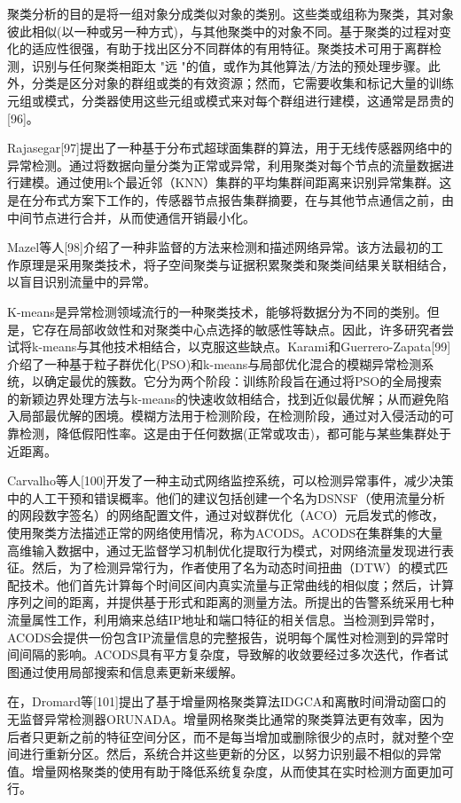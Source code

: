 聚类分析的目的是将一组对象分成类似对象的类别。这些类或组称为聚类，其对象彼此相似(以一种或另一种方式)，与其他聚类中的对象不同。基于聚类的过程对变化的适应性很强，有助于找出区分不同群体的有用特征。聚类技术可用于离群检测，识别与任何聚类相距太 "远 "的值，或作为其他算法/方法的预处理步骤。此外，分类是区分对象的群组或类的有效资源；然而，它需要收集和标记大量的训练元组或模式，分类器使用这些元组或模式来对每个群组进行建模，这通常是昂贵的[96]。

Rajasegar[97]提出了一种基于分布式超球面集群的算法，用于无线传感器网络中的异常检测。通过将数据向量分类为正常或异常，利用聚类对每个节点的流量数据进行建模。通过使用k个最近邻（KNN）集群的平均集群间距离来识别异常集群。这是在分布式方案下工作的，传感器节点报告集群摘要，在与其他节点通信之前，由中间节点进行合并，从而使通信开销最小化。

Mazel等人[98]介绍了一种非监督的方法来检测和描述网络异常。该方法最初的工作原理是采用聚类技术，将子空间聚类与证据积累聚类和聚类间结果关联相结合，以盲目识别流量中的异常。

K-means是异常检测领域流行的一种聚类技术，能够将数据分为不同的类别。但是，它存在局部收敛性和对聚类中心点选择的敏感性等缺点。因此，许多研究者尝试将k-means与其他技术相结合，以克服这些缺点。Karami和Guerrero-Zapata[99]介绍了一种基于粒子群优化(PSO)和k-means与局部优化混合的模糊异常检测系统，以确定最优的簇数。它分为两个阶段：训练阶段旨在通过将PSO的全局搜索的新颖边界处理方法与k-means的快速收敛相结合，找到近似最优解；从而避免陷入局部最优解的困境。模糊方法用于检测阶段，在检测阶段，通过对入侵活动的可靠检测，降低假阳性率。这是由于任何数据(正常或攻击)，都可能与某些集群处于近距离。

Carvalho等人[100]开发了一种主动式网络监控系统，可以检测异常事件，减少决策中的人工干预和错误概率。他们的建议包括创建一个名为DSNSF（使用流量分析的网段数字签名）的网络配置文件，通过对蚁群优化（ACO）元启发式的修改，使用聚类方法描述正常的网络使用情况，称为ACODS。ACODS在集群集的大量高维输入数据中，通过无监督学习机制优化提取行为模式，对网络流量发现进行表征。然后，为了检测异常行为，作者使用了名为动态时间扭曲（DTW）的模式匹配技术。他们首先计算每个时间区间内真实流量与正常曲线的相似度；然后，计算序列之间的距离，并提供基于形式和距离的测量方法。所提出的告警系统采用七种流量属性工作，利用熵来总结IP地址和端口特征的相关信息。当检测到异常时，ACODS会提供一份包含IP流量信息的完整报告，说明每个属性对检测到的异常时间间隔的影响。ACODS具有平方复杂度，导致解的收敛要经过多次迭代，作者试图通过使用局部搜索和信息素更新来缓解。

在，Dromard等[101]提出了基于增量网格聚类算法IDGCA和离散时间滑动窗口的无监督异常检测器ORUNADA。增量网格聚类比通常的聚类算法更有效率，因为后者只更新之前的特征空间分区，而不是每当增加或删除很少的点时，就对整个空间进行重新分区。然后，系统合并这些更新的分区，以努力识别最不相似的异常值。增量网格聚类的使用有助于降低系统复杂度，从而使其在实时检测方面更加可行。

